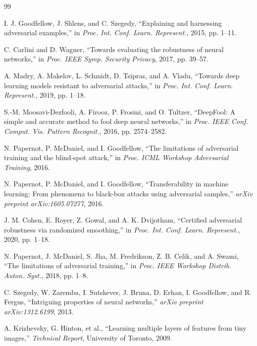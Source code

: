 \documentclass[10pt,conference]{IEEEtran}
\begin{document}
\begin{thebibliography}{99}

 I. J. Goodfellow, J. Shlens, and C. Szegedy, ``Explaining and harnessing adversarial examples,'' in \textit{Proc. Int. Conf. Learn. Represent.}, 2015, pp. 1--11.

 C. Carlini and D. Wagner, ``Towards evaluating the robustness of neural networks,'' in \textit{Proc. IEEE Symp. Security Privacy}, 2017, pp. 39--57.

 A. Madry, A. Makelov, L. Schmidt, D. Tsipras, and A. Vladu, ``Towards deep learning models resistant to adversarial attacks,'' in \textit{Proc. Int. Conf. Learn. Represent.}, 2019, pp. 1--18.

 S.-M. Moosavi-Dezfooli, A. Firooz, P. Frosini, and O. Tultzer, ``DeepFool: A simple and accurate method to fool deep neural networks,'' in \textit{Proc. IEEE Conf. Comput. Vis. Pattern Recognit.}, 2016, pp. 2574--2582.

 N. Papernot, P. McDaniel, and I. Goodfellow, ``The limitations of adversarial training and the blind-spot attack,'' in \textit{Proc. ICML Workshop Adversarial Training}, 2016.

 N. Papernot, P. McDaniel, and I. Goodfellow, ``Transferability in machine learning: From phenomena to black-box attacks using adversarial samples,'' \textit{arXiv preprint arXiv:1605.07277}, 2016.

 J. M. Cohen, E. Royer, Z. Gowal, and A. K. Dvijotham, ``Certified adversarial robustness via randomized smoothing,'' in \textit{Proc. Int. Conf. Learn. Represent.}, 2020, pp. 1--18.

 N. Papernot, J. McDaniel, S. Jha, M. Fredrikson, Z. B. Celik, and A. Swami, ``The limitations of adversarial training,'' in \textit{Proc. IEEE Workshop Distrib. Auton. Syst.}, 2018, pp. 1--8.

 C. Szegedy, W. Zaremba, I. Sutskever, J. Bruna, D. Erhan, I. Goodfellow, and R. Fergus, ``Intriguing properties of neural networks,'' \textit{arXiv preprint arXiv:1312.6199}, 2013.

 A. Krizhevsky, G. Hinton, et al., ``Learning multiple layers of features from tiny images,'' \textit{Technical Report}, University of Toronto, 2009.


\end{thebibliography}
\end{document}
